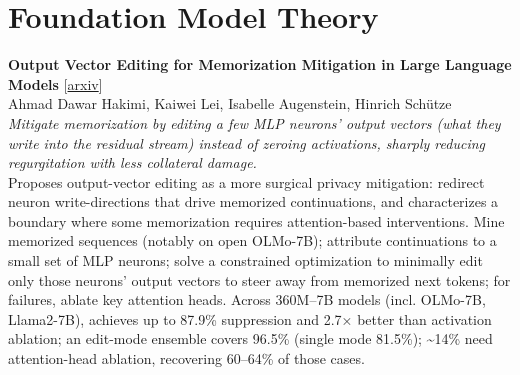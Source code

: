 \documentclass[12pt,letterpaper]{article}
\begin{document}
\medskip


\section*{Foundation Model Theory}

{\small\textbf{Output Vector Editing for Memorization Mitigation in Large Language Models}} {\scriptsize[\href{https://arxiv.org/abs/2606.18767}{arxiv}]}\\
{\scriptsize Ahmad Dawar Hakimi, Kaiwei Lei, Isabelle Augenstein, Hinrich Schütze}\\

{\small\textit{Mitigate memorization by editing a few MLP neurons' output vectors (what they write into the residual stream) instead of zeroing activations, sharply reducing regurgitation with less collateral damage.}}\\[1pt]
{\footnotesize Proposes output-vector editing as a more surgical privacy mitigation: redirect neuron write-directions that drive memorized continuations, and characterizes a boundary where some memorization requires attention-based interventions. Mine memorized sequences (notably on open OLMo-7B); attribute continuations to a small set of MLP neurons; solve a constrained optimization to minimally edit only those neurons' output vectors to steer away from memorized next tokens; for failures, ablate key attention heads. Across 360M--7B models (incl. OLMo-7B, Llama2-7B), achieves up to 87.9\% suppression and 2.7× better than activation ablation; an edit-mode ensemble covers 96.5\% (single mode 81.5\%); \textasciitilde{}14\% need attention-head ablation, recovering 60--64\% of those cases.}

\medskip
\end{document}
